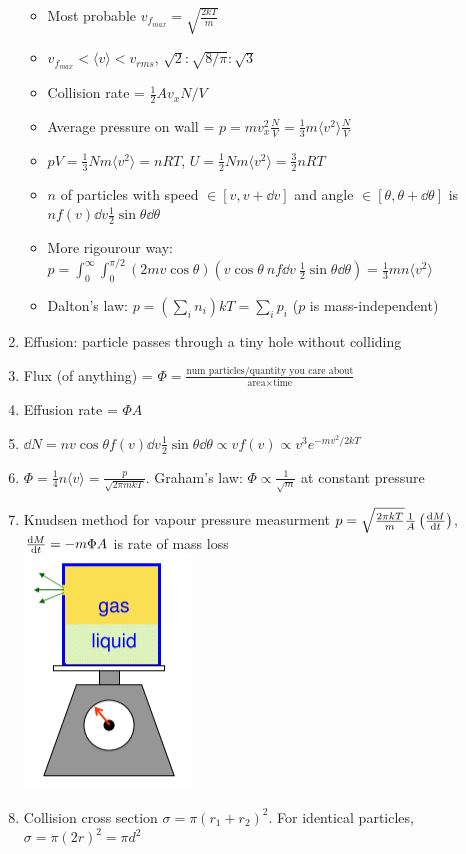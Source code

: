 \documentclass{article}
\theoremstyle{remark}
\begin{document}
\begin{enumerate}
\begin{itemize}
            \item Most probable $v_{f_{max}}=\sqrt{\frac{2kT}{m}}$
            \item $v_{f_{max}}<\langle v\rangle<v_{rms}$, $\sqrt{2}:\sqrt{8/\pi}:\sqrt{3}$
            \item Collision rate = $\frac{1}{2}Av_xN/V$
            \item Average pressure on wall = $p=mv_x^2\frac{N}{V}=\frac{1}{3}m\langle v^2\rangle\frac{N}{V}$
            \item $pV=\frac{1}{3}Nm\langle v^2\rangle=nRT$, $U=\frac{1}{2}Nm\langle v^2\rangle=\frac{3}{2}nRT$
            \item $n$ of particles with speed $\in[v,v+\dd v]$ and angle $\in[\theta,\theta+\dd\theta]$ is $\boxed{nf(v)\dd v\frac{1}{2}\sin\theta\dd\theta}$
            \item More rigourour way: $p=\int_0^\infty\int_0^{\pi/2} (2mv\cos\theta)\left(v\cos\theta\ nf\dd v\ \frac{1}{2}\sin\theta\dd\theta\right)=\frac{1}{3}mn\langle v^2\rangle$
            \item Dalton's law: $p=\left(\sum_i n_i\right)kT=\sum_i p_i$ ($p$ is mass-independent)
        \end{itemize}
    \item Effusion: particle passes through a tiny hole without colliding
    \item Flux (of anything) = $\Phi=\frac{\text{num particles/quantity you care about}}{\text{area}\times\text{time}}$
    \item Effusion rate = $\Phi A$
    \item $\dd N= nv\cos\theta f(v)\dd v\frac{1}{2}\sin\theta\dd\theta \propto vf(v)\propto v^3e^{-mv^2/2kT}$
    \item $\boxed{\Phi=\frac{1}{4}n\langle v\rangle}=\frac{p}{\sqrt{2\pi mkT}}$. Graham's law: $\Phi\propto\frac{1}{\sqrt{m}}$ at constant pressure
    \item Knudsen method for vapour pressure measurment $p=\sqrt{\frac{2\pi kT}{m}}\frac{1}{A}\left(\dv{M}{t}\right)$, $\dv{M}{t}=-m\Phi A$ is rate of mass loss\\
            \includegraphics*[width=0.1\linewidth]{knudsen method.png}
    \item Collision cross section $\sigma=\pi(r_1+r_2)^2$. For identical particles, $\boxed{\sigma=\pi(2r)^2}=\pi d^2$

\end{enumerate}
\end{document}
